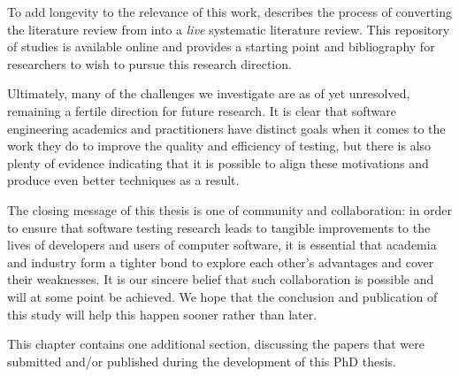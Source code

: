 To add longevity to the relevance of this work,  describes the process of converting the literature review from  into a \textit{live} systematic literature review.
This repository of studies is available online and provides a starting point and bibliography for researchers to wish to pursue this research direction.

Ultimately, many of the challenges we investigate are as of yet unresolved, remaining a fertile direction for future research.
It is clear that software engineering academics and practitioners have distinct goals when it comes to the work they do to improve the quality and efficiency of testing, but there is also plenty of evidence indicating that it is possible to align these motivations and produce even better techniques as a result.

The closing message of this thesis is one of community and collaboration: in order to ensure that software testing research leads to tangible improvements to the lives of developers and users of computer software, it is essential that academia and industry form a tighter bond to explore each other's advantages and cover their weaknesses.
It is our sincere belief that such collaboration is possible and will at some point be achieved.
We hope that the conclusion and publication of this study will help this happen sooner rather than later.

This chapter contains one additional section,
discussing the papers that were submitted and/or published during the development of this PhD thesis.


